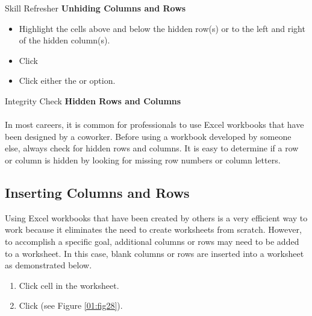 \begin{center}
	\begin{sklbox}{Skill Refresher}
		\textbf{Unhiding Columns and Rows}
		\\
		\begin{itemize}
			\setlength{\itemsep}{0pt}
			\setlength{\parskip}{0pt}
			\setlength{\parsep}{0pt}
			
			\item Highlight the cells above and below the hidden row(s) or to the left and right of the hidden column(s).
			\item Click 
			\item Click either the  or  option.
			
		\end{itemize}
	\end{sklbox}
\end{center}

\begin{center}
	\begin{infobox}{Integrity Check}
		\textbf{Hidden Rows and Columns}
		\\
		\\
		In most careers, it is common for professionals to use Excel workbooks that have been designed by a coworker. Before using a workbook developed by someone else, always check for hidden rows and columns. It is easy to determine if a row or column is hidden by looking for missing row  numbers or column letters.
	\end{infobox}
\end{center}

\subsection{Inserting Columns and Rows}

Using Excel workbooks that have been created by others is a very efficient way to work because it eliminates the need to create worksheets from scratch. However, to accomplish a specific goal, additional columns or rows may need to be added to a worksheet. In this case, blank columns or rows are inserted into a worksheet as demonstrated below.

\begin{enumerate}
	\item Click cell  in the  worksheet.
	\item Click  (see Figure \ref{01:fig28}).
\end{enumerate}

